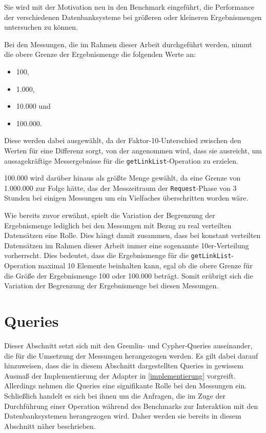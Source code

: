 Sie wird mit der Motivation neu in den Benchmark eingeführt, die Performance der verschiedenen Datenbanksysteme bei größeren oder kleineren Ergebnismengen untersuchen zu können. 

Bei den Messungen, die im Rahmen dieser Arbeit durchgeführt werden, nimmt die obere Grenze der Ergebnismenge die folgenden Werte an:
\begin{itemize}
    \item 100,
    \item 1.000,
    \item 10.000 und
    \item 100.000. 
\end{itemize}
Diese werden dabei ausgewählt, da der Faktor-10-Unterschied zwischen den Werten für eine Differenz sorgt, von der angenommen wird, dass sie ausreicht, um aussagekräftige Messergebnisse für die \texttt{getLinkList}-Operation zu erzielen. 

100.000 wird darüber hinaus als größte Menge gewählt, da eine Grenze von 1.000.000 zur Folge hätte, das der Messzeitraum der \texttt{Request}-Phase von 3 Stunden bei einigen Messungen um ein Vielfaches überschritten worden wäre.

Wie bereits zuvor erwähnt, spielt die Variation der Begrenzung der Ergebnismenge lediglich bei den Messungen mit Bezug zu real verteilten Datensätzen eine Rolle. Dies hängt damit zusammen, dass bei konstant verteilten Datensätzen im Rahmen dieser Arbeit immer eine sogenannte 10er-Verteilung vorherrscht. Dies bedeutet, dass die Ergebnismenge für die \texttt{getLinkList}-Operation maximal 10 Elemente beinhalten kann, egal ob die obere Grenze für die Größe der Ergebnismenge 100 oder 100.000 beträgt. Somit erübrigt sich die Variation der Begrenzung der Ergebnismenge bei diesen Messungen. 

\section{Queries}
\label{analyse:queries}
Dieser Abschnitt setzt sich mit den Gremlin- und Cypher-Queries auseinander, die für die Umsetzung der Messungen herangezogen werden. Es gilt dabei darauf hinzuweisen, dass die in diesem Abschnitt dargestellten Queries in gewissem Ausmaß der Implementierung der Adapter in \autoref{implementierung} vorgreift. Allerdings nehmen die Queries eine signifikante Rolle bei den Messungen ein. Schließlich handelt es sich bei ihnen um die Anfragen, die im Zuge der Durchführung einer Operation während des Benchmarks zur Interaktion mit den Datenbanksystemen herangezogen wird. Daher werden sie bereits in diesem Abschnitt näher beschrieben.

